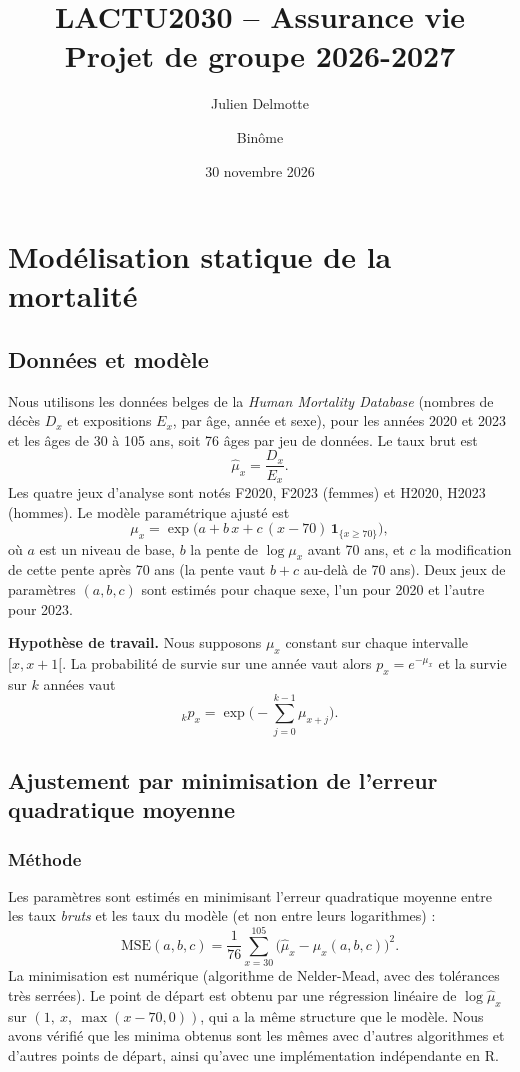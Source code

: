 \documentclass[11pt,a4paper]{article}
\title{LACTU2030 -- Assurance vie\\ Projet de groupe 2026-2027}
\author{%
Julien Delmotte \and Binôme}
\date{30 novembre 2026}
\newcommand{\mux}{\mu_x}
\newcommand{\muhat}{\hat{\mu}_x}
\begin{document}
\maketitle
\tableofcontents
\newpage

\section{Modélisation statique de la mortalité}

\subsection{Données et modèle}

Nous utilisons les données belges de la \emph{Human Mortality Database} (nombres de décès $D_x$ et expositions $E_x$, par âge, année et sexe), pour les années 2020 et 2023 et les âges de 30 à 105 ans, soit 76 âges par jeu de données. Le taux brut est
\[
\muhat = \frac{D_x}{E_x}.
\]
Les quatre jeux d'analyse sont notés F2020, F2023 (femmes) et H2020, H2023 (hommes). Le modèle paramétrique ajusté est
\[
\mux = \exp\!\Big( a + b\,x + c\,(x-70)\,\mathbf 1_{\{x\ge 70\}} \Big),
\]
où $a$ est un niveau de base, $b$ la pente de $\log \mux$ avant 70 ans, et $c$ la modification de cette pente après 70 ans (la pente vaut $b+c$ au-delà de 70 ans). Deux jeux de paramètres $(a,b,c)$ sont estimés pour chaque sexe, l'un pour 2020 et l'autre pour 2023.

\textbf{Hypothèse de travail.} Nous supposons $\mux$ constant sur chaque intervalle $[x,x+1[$. La probabilité de survie sur une année vaut alors $p_x = e^{-\mux}$ et la survie sur $k$ années vaut
\[
{}_kp_x = \exp\!\Big(-\sum_{j=0}^{k-1}\mu_{x+j}\Big).
\]

\subsection{Ajustement par minimisation de l'erreur quadratique moyenne}

\subsubsection{Méthode}

Les paramètres sont estimés en minimisant l'erreur quadratique moyenne entre les taux \emph{bruts} et les taux du modèle (et non entre leurs logarithmes) :
\[
\mathrm{MSE}(a,b,c)=\frac{1}{76}\sum_{x=30}^{105}\Big(\muhat-\mux(a,b,c)\Big)^2 .
\]
La minimisation est numérique (algorithme de Nelder-Mead, avec des tolérances très serrées). Le point de départ est obtenu par une régression linéaire de $\log\muhat$ sur $(1,\ x,\ \max(x-70,0))$, qui a la même structure que le modèle. Nous avons vérifié que les minima obtenus sont les mêmes avec d'autres algorithmes et d'autres points de départ, ainsi qu'avec une implémentation indépendante en R.
\end{document}
